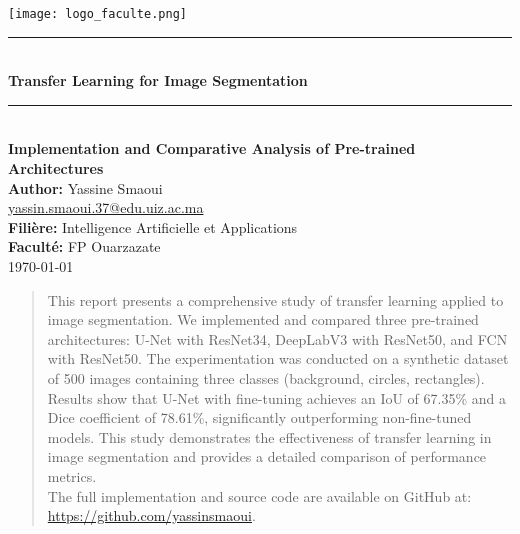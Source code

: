 \documentclass[12pt,a4paper]{article}
\newcommand{\HRule}{\rule{\linewidth}{0.5mm}}
\begin{document}
\begin{titlepage}
    \begin{center}
        \texttt{[image: logo\_faculte.png]} \\[1cm] %

        \HRule \\[0.4cm]
        {\Huge \bfseries Transfer Learning for Image Segmentation}\\[0.4cm]
        \HRule \\[1.5cm]

        {\Large \textbf{Implementation and Comparative Analysis of Pre-trained Architectures}}\\[1.5cm]

        \textbf{Author:} Yassine Smaoui \\
        \href{mailto:yassin.smaoui.37@edu.uiz.ac.ma}{yassin.smaoui.37@edu.uiz.ac.ma} \\[1cm]

        \textbf{Filière:} Intelligence Artificielle et Applications \\
        \textbf{Faculté:} FP Ouarzazate \\[1.5cm]

        {\large \today}
        \begin{abstract}
This report presents a comprehensive study of transfer learning applied to image segmentation. We implemented and compared three pre-trained architectures: U-Net with ResNet34, DeepLabV3 with ResNet50, and FCN with ResNet50. The experimentation was conducted on a synthetic dataset of 500 images containing three classes (background, circles, rectangles). Results show that U-Net with fine-tuning achieves an IoU of 67.35\% and a Dice coefficient of 78.61\%, significantly outperforming non-fine-tuned models. This study demonstrates the effectiveness of transfer learning in image segmentation and provides a detailed comparison of performance metrics.\\
The full implementation and source code are available on GitHub at:\\
\href{https://github.com/yassinsmaoui/last_Tps.deep/blob/main/segmentation_transfer_learning.ipynb}{https://github.com/yassinsmaoui}.
\end{abstract}
    \end{center}
\end{titlepage}


\tableofcontents
\newpage
\end{document}
